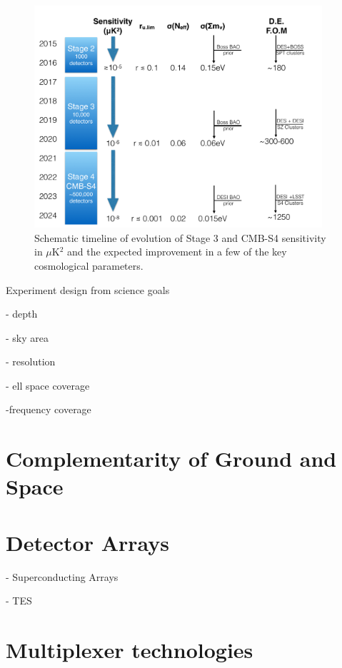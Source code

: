      
    \begin{figure}[ht]
\centering \includegraphics[width=0.95\textwidth]{Intro/Fig-FlowChart1_v1.pdf}
\caption{Schematic timeline of evolution of Stage 3 and CMB-S4 
sensitivity in $\mu$K$^2$ and the expected improvement in a few of the key cosmological parameters.}
\label{fig:science_timeline}
\end{figure} 

Experiment design from science goals

     
     - depth
     
     - sky area
     
     - resolution
     
          - ell space coverage
     
     -frequency coverage


\section{Complementarity of Ground and Space}

\section{Detector Arrays}
     
     - Superconducting Arrays
          
     - TES

\section{Multiplexer technologies}

